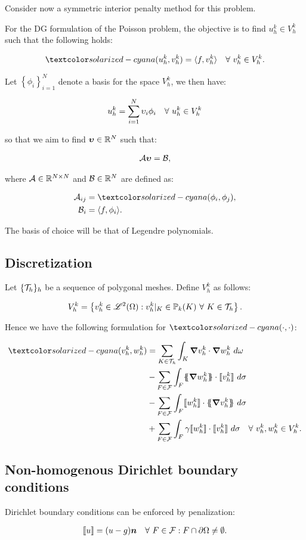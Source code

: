 Consider now a symmetric interior penalty method for this problem.

For the DG formulation of the Poisson problem, the objective is to find $u^k_h \in V^k_h$ such that the following holds:

\begin{gather}
    \boa{u^k_h}{v^k_h} = \langle f, v^k_h \rangle \quad \Forall v^k_h \in V^k_h.
\end{gather}

Let $\left\{ \phi_i \right\}_{i = 1}^N$ denote a basis for the space $V^k_h$, we then have:

\begin{gather}
    u^k_h = \sum_{i = 1}^N \upsilon_i \phi_i \quad \forall ~ u^k_h \in V^k_h
\end{gather}

so that we aim to find $\bm{\upsilon} \in \mathbb{R}^N$ such that:

\begin{gather}
    \mathcal{A} \bm{\upsilon} = \mathcal{B},
\end{gather}

where $\mathcal{A} \in \mathbb{R}^{N \times N}$ and $\mathcal{B} \in \mathbb{R}^N$ are defined as:

\begin{align}
    \MA_{ij} &= \boa{\phi_i}{\phi_j}, \\ 
    \VB_i &= \langle f, \phi_i \rangle.
\end{align}

The basis of choice will be that of Legendre polynomials.

\subsection{Discretization}

Let $\{\mathcal{T}_h\}_h$ be a sequence of polygonal meshes. Define $V^k_h$ as follows:

\begin{gather}
    V^k_h = \left\{ v^k_h \in \mathscr{L}^2(\Omega): v^k_h \vert_K \in \mathbb{P}_{k}(K) ~ \forall ~ K \in \mathcal{T}_h \right\}.
\end{gather}

Hence we have the following formulation for $\boa{\cdot}{\cdot}$:

\begin{align}
    \boa{v^k_h}{w^k_h} &= \sum_{K \in \Tau_h} \int_K \grad v^k_h \cdot \grad w^k_h ~ d \omega \\
    &- \sum_{F \in \F} \int_F \{\!\!\{ \grad w^k_h \}\!\!\} \cdot \llbracket v^k_h \rrbracket ~ d \sigma \\
    &- \sum_{F \in \F} \int_F \llbracket w^k_h \rrbracket \cdot \{\!\!\{ \grad v^k_h \}\!\!\} ~ d \sigma \\
    &+ \sum_{F \in \F} \int_F \gamma \llbracket w^k_h \rrbracket \cdot \llbracket v^k_h \rrbracket ~ d \sigma \quad \Forall v^k_h, w^k_h \in V^k_h.
\end{align}

\subsection{Non-homogenous Dirichlet boundary conditions}

Dirichlet boundary conditions can be enforced by penalization:

\begin{gather}
    \llbracket u \rrbracket = (u - g) \bm{n} \quad \forall ~ F \in \mathcal{F} : F \cap \partial \Omega \neq \emptyset.
\end{gather}